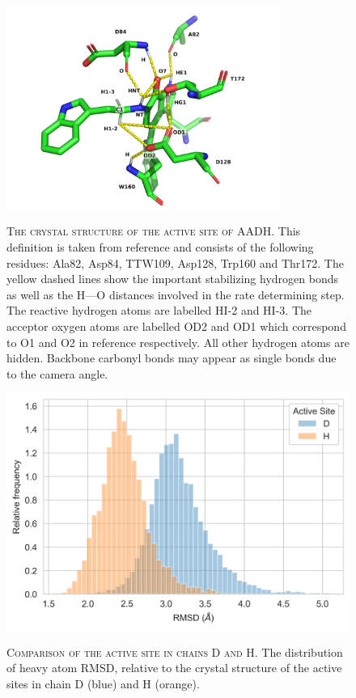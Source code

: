 \begin{figure}
    \centering
    \caption[The crystal structure of the active site of AADH]{\textsc{The crystal structure of the active site of AADH}. This definition is taken from reference \cite{ranaghanInitioQMMM2017} and consists of the following residues: Ala82, Asp84, TTW109, Asp128, Trp160 and Thr172. The yellow dashed lines show the important stabilizing hydrogen bonds as well as the H---O distances involved in the rate determining step.  The reactive hydrogen atoms are labelled HI-2 and HI-3. The acceptor oxygen atoms are labelled OD2 and OD1 which correspond to O1 and O2 in reference \cite{masgrauAtomicDescriptionEnzyme2006} respectively. All other hydrogen atoms are hidden. Backbone carbonyl bonds may appear as single bonds due to the camera angle.}
    \includegraphics[width=0.8\textwidth]{chapters/aadh/figures/aadh_active_site.png}
    \label{fig:aadh_active_site}
\end{figure}

\begin{figure}
    \centering
    \caption[Comparison of the active site in chains D and H]{\textsc{Comparison of the active site in chains D and H}. The distribution of heavy atom RMSD, relative to the crystal structure of the active sites in chain D (blue) and H (orange). }
    \includegraphics{chapters/aadh/figures/rmsd_dististribution.png}
    \label{fig:as_rmsd_dist}
\end{figure}

